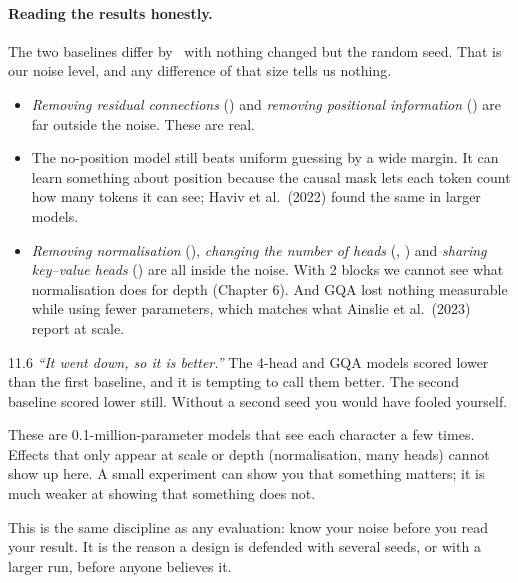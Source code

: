\paragraph{Reading the results honestly.} The two baselines differ by \nElevenSpread\ with nothing
changed but the random seed. That is our noise level, and any difference of that size tells us nothing.
\begin{itemize}
\item \emph{Removing residual connections} (\nElevenDNoRes) and \emph{removing positional information}
(\nElevenDNoPos) are far outside the noise. These are real.
\item The no-position model still beats uniform guessing by a wide margin. It can learn something about
position because the causal mask lets each token count how many tokens it can see; Haviv et al.\ (2022)
found the same in larger models.
\item \emph{Removing normalisation} (\nElevenDNoNorm), \emph{changing the number of heads}
(\nElevenDOneHead, \nElevenDFourHeads) and \emph{sharing key--value heads} (\nElevenDGqa) are all inside
the noise. With 2 blocks we cannot see what normalisation does for depth (Chapter 6). And GQA lost nothing
measurable while using fewer parameters, which matches what Ainslie et al.\ (2023) report at scale.
\end{itemize}

\begin{wrongidea}{11.6}
\emph{``It went down, so it is better.''} The 4-head and GQA models scored lower than the first baseline,
and it is tempting to call them better. The second baseline scored lower still. Without a second seed you
would have fooled yourself.
\end{wrongidea}

\begin{breaks}
These are 0.1-million-parameter models that see each character a few times. Effects that only appear at
scale or depth (normalisation, many heads) cannot show up here. A small experiment can show you that
something matters; it is much weaker at showing that something does not.
\end{breaks}

\Why This is the same discipline as any evaluation: know your noise before you read your result. It is
the reason a design is defended with several seeds, or with a larger run, before anyone believes it.


